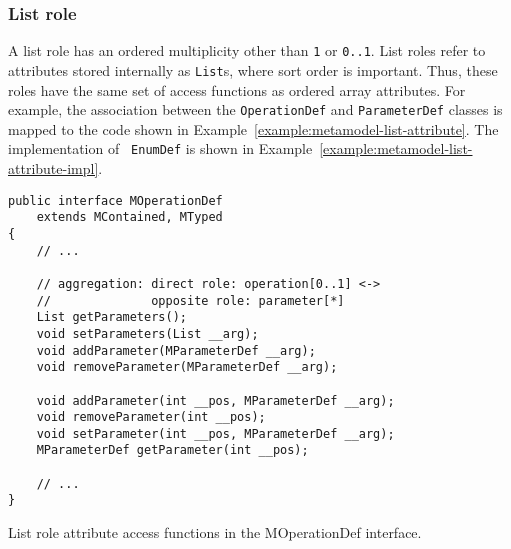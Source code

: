 \subsubsection{List role}

A list role has an ordered multiplicity other than {\tt 1} or {\tt 0..1}. List
roles refer to attributes stored internally as {\tt List}s, where sort order is
important. Thus, these roles have the same set of access functions as ordered
array attributes. For example, the association between the {\tt OperationDef}
and {\tt ParameterDef} classes is mapped to the code shown in
Example~\ref{example:metamodel-list-attribute}. The implementation of {\tt
EnumDef} is shown in Example~\ref{example:metamodel-list-attribute-impl}.

\begin{Example}
\begin{minifbox}
\begin{small}
\begin{verbatim}
public interface MOperationDef
    extends MContained, MTyped
{
    // ...

    // aggregation: direct role: operation[0..1] <->
    //              opposite role: parameter[*]
    List getParameters();
    void setParameters(List __arg);
    void addParameter(MParameterDef __arg);
    void removeParameter(MParameterDef __arg);

    void addParameter(int __pos, MParameterDef __arg);
    void removeParameter(int __pos);
    void setParameter(int __pos, MParameterDef __arg);
    MParameterDef getParameter(int __pos);

    // ...
}
\end{verbatim}
\end{small}
\end{minifbox}
\caption{List role attribute access functions in the MOperationDef interface.}
\label{example:metamodel-list-attribute}
\end{Example}

